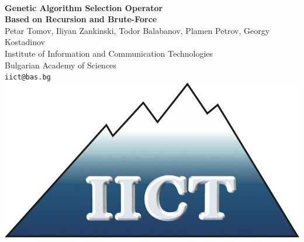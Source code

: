 \documentclass[a0,portrait,25pt]{sciposter}
\begin{document}
\pagecolor{LightGray}

\begin{mdframed}[backgroundcolor=white,roundcorner=4pt,shadow=true,linewidth=1pt]
\begin{minipage}[b]{1.44  \linewidth}
\begin{multicols}{2} \ \color{DimGray}

\Huge \textbf{Genetic Algorithm Selection Operator \\ Based on Recursion and Brute-Force} \\ [0.4cm]
\Large {Petar Tomov, Iliyan Zankinski, Todor Balabanov, Plamen Petrov, Georgy Kostadinov} \\ [0.4cm]
\huge Institute of Information and Communication Technologies \\ Bulgarian Academy of Sciences \\ [0.4cm]
\Large \texttt{iict@bas.bg} \\ [1.4cm]

\includegraphics[width=20cm]{logo-iict-en}
\end{multicols}
\end{minipage}
\end{mdframed}

\vspace{0.5cm}
\end{document}

